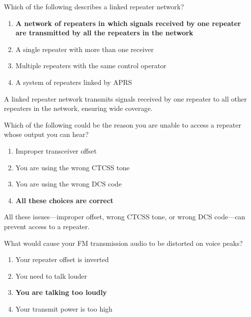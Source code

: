 \begin{tcolorbox}[colback=gray!10!white,colframe=black!75!black,title={T2B03}]
    Which of the following describes a linked repeater network?
    \begin{enumerate}[label=\Alph*),noitemsep]
        \item \textbf{A network of repeaters in which signals received by one repeater are transmitted by all the repeaters in the network}
        \item A single repeater with more than one receiver
        \item Multiple repeaters with the same control operator
        \item A system of repeaters linked by APRS
    \end{enumerate}
\end{tcolorbox}

A linked repeater network transmits signals received by one repeater to all other repeaters in the network, ensuring wide coverage.

\begin{tcolorbox}[colback=gray!10!white,colframe=black!75!black,title={T2B04}]
    Which of the following could be the reason you are unable to access a repeater whose output you can hear?
    \begin{enumerate}[label=\Alph*),noitemsep]
        \item Improper transceiver offset
        \item You are using the wrong CTCSS tone
        \item You are using the wrong DCS code
        \item \textbf{All these choices are correct}
    \end{enumerate}
\end{tcolorbox}

All these issues—improper offset, wrong CTCSS tone, or wrong DCS code—can prevent access to a repeater.

\begin{tcolorbox}[colback=gray!10!white,colframe=black!75!black,title={T2B05}]
    What would cause your FM transmission audio to be distorted on voice peaks?
    \begin{enumerate}[label=\Alph*),noitemsep]
        \item Your repeater offset is inverted
        \item You need to talk louder
        \item \textbf{You are talking too loudly}
        \item Your transmit power is too high
    \end{enumerate}
\end{tcolorbox}

